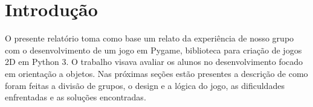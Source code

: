 \section{Introdução}

    O presente relatório toma como base um relato da experiência de nosso grupo com o desenvolvimento de um jogo em Pygame, biblioteca para criação de jogos 2D em Python 3. O trabalho visava avaliar os alunos no desenvolvimento focado em orientação a objetos.
    Nas próximas seções estão presentes a descrição de como foram feitas a divisão de grupos, o design e a lógica do jogo, as dificuldades enfrentadas e as soluções encontradas.